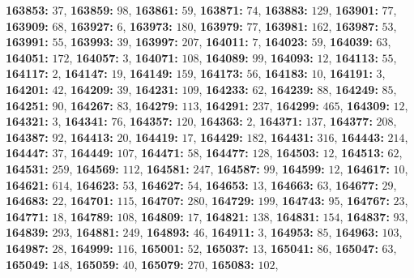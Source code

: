 \textsf{\bfseries 163853:} $37$, \textsf{\bfseries 163859:} $98$, \textsf{\bfseries 163861:} $59$, \textsf{\bfseries 163871:} $74$, \textsf{\bfseries 163883:} $129$, \textsf{\bfseries 163901:} $77$, \textsf{\bfseries 163909:} $68$, \textsf{\bfseries 163927:} $6$, \textsf{\bfseries 163973:} $180$, \textsf{\bfseries 163979:} $77$, \textsf{\bfseries 163981:} $162$, \textsf{\bfseries 163987:} $53$, \textsf{\bfseries 163991:} $55$, \textsf{\bfseries 163993:} $39$, \textsf{\bfseries 163997:} $207$, \textsf{\bfseries 164011:} $7$, \textsf{\bfseries 164023:} $59$, \textsf{\bfseries 164039:} $63$, \textsf{\bfseries 164051:} $172$, \textsf{\bfseries 164057:} $3$, \textsf{\bfseries 164071:} $108$, \textsf{\bfseries 164089:} $99$, \textsf{\bfseries 164093:} $12$, \textsf{\bfseries 164113:} $55$, \textsf{\bfseries 164117:} $2$, \textsf{\bfseries 164147:} $19$, \textsf{\bfseries 164149:} $159$, \textsf{\bfseries 164173:} $56$, \textsf{\bfseries 164183:} $10$, \textsf{\bfseries 164191:} $3$, \textsf{\bfseries 164201:} $42$, \textsf{\bfseries 164209:} $39$, \textsf{\bfseries 164231:} $109$, \textsf{\bfseries 164233:} $62$, \textsf{\bfseries 164239:} $88$, \textsf{\bfseries 164249:} $85$, \textsf{\bfseries 164251:} $90$, \textsf{\bfseries 164267:} $83$, \textsf{\bfseries 164279:} $113$, \textsf{\bfseries 164291:} $237$, \textsf{\bfseries 164299:} $465$, \textsf{\bfseries 164309:} $12$, \textsf{\bfseries 164321:} $3$, \textsf{\bfseries 164341:} $76$, \textsf{\bfseries 164357:} $120$, \textsf{\bfseries 164363:} $2$, \textsf{\bfseries 164371:} $137$, \textsf{\bfseries 164377:} $208$, \textsf{\bfseries 164387:} $92$, \textsf{\bfseries 164413:} $20$, \textsf{\bfseries 164419:} $17$, \textsf{\bfseries 164429:} $182$, \textsf{\bfseries 164431:} $316$, \textsf{\bfseries 164443:} $214$, \textsf{\bfseries 164447:} $37$, \textsf{\bfseries 164449:} $107$, \textsf{\bfseries 164471:} $58$, \textsf{\bfseries 164477:} $128$, \textsf{\bfseries 164503:} $12$, \textsf{\bfseries 164513:} $62$, \textsf{\bfseries 164531:} $259$, \textsf{\bfseries 164569:} $112$, \textsf{\bfseries 164581:} $247$, \textsf{\bfseries 164587:} $99$, \textsf{\bfseries 164599:} $12$, \textsf{\bfseries 164617:} $10$, \textsf{\bfseries 164621:} $614$, \textsf{\bfseries 164623:} $53$, \textsf{\bfseries 164627:} $54$, \textsf{\bfseries 164653:} $13$, \textsf{\bfseries 164663:} $63$, \textsf{\bfseries 164677:} $29$, \textsf{\bfseries 164683:} $22$, \textsf{\bfseries 164701:} $115$, \textsf{\bfseries 164707:} $280$, \textsf{\bfseries 164729:} $199$, \textsf{\bfseries 164743:} $95$, \textsf{\bfseries 164767:} $23$, \textsf{\bfseries 164771:} $18$, \textsf{\bfseries 164789:} $108$, \textsf{\bfseries 164809:} $17$, \textsf{\bfseries 164821:} $138$, \textsf{\bfseries 164831:} $154$, \textsf{\bfseries 164837:} $93$, \textsf{\bfseries 164839:} $293$, \textsf{\bfseries 164881:} $249$, \textsf{\bfseries 164893:} $46$, \textsf{\bfseries 164911:} $3$, \textsf{\bfseries 164953:} $85$, \textsf{\bfseries 164963:} $103$, \textsf{\bfseries 164987:} $28$, \textsf{\bfseries 164999:} $116$, \textsf{\bfseries 165001:} $52$, \textsf{\bfseries 165037:} $13$, \textsf{\bfseries 165041:} $86$, \textsf{\bfseries 165047:} $63$, \textsf{\bfseries 165049:} $148$, \textsf{\bfseries 165059:} $40$, \textsf{\bfseries 165079:} $270$, \textsf{\bfseries 165083:} $102$, 
